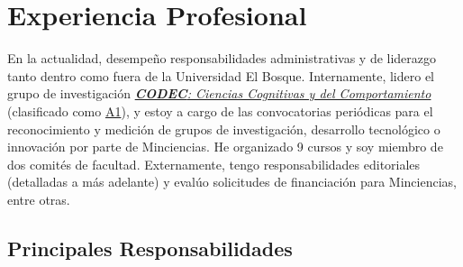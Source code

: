 \documentclass[11pt,a4paper,]{awesome-cv}
\begin{document}
\hypertarget{experiencia-profesional}{%
\section{Experiencia Profesional}\label{experiencia-profesional}}

\begin{footnotesize}
En la actualidad, desempeño responsabilidades administrativas y de liderazgo tanto dentro como fuera de la Universidad El Bosque. Internamente, lidero el grupo de investigación \href{https://grupo-codec.netlify.app/}{\textit{\textbf{CODEC}: Ciencias Cognitivas y del Comportamiento}} (clasificado como \href{https://scienti.minciencias.gov.co/gruplac/jsp/visualiza/visualizagr.jsp?nro=00000000001446}{A1}), y estoy a cargo de las convocatorias periódicas para el reconocimiento y medición de grupos de investigación, desarrollo tecnológico o innovación por parte de Minciencias. He organizado 9 cursos y soy miembro de dos comités de facultad. Externamente, tengo responsabilidades editoriales (detalladas a más adelante) y evalúo solicitudes de financiación para Minciencias, entre otras.
\end{footnotesize}

\hypertarget{principales-responsabilidades}{%
\subsection{Principales
Responsabilidades}\label{principales-responsabilidades}}
\end{document}
